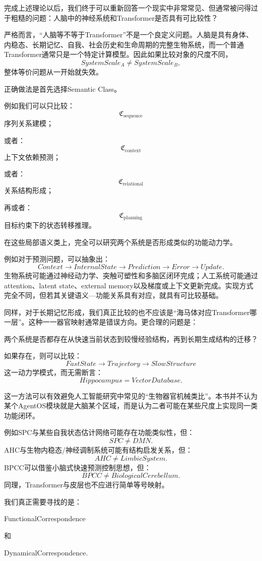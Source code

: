 完成上述理论以后，我们终于可以重新回答一个现实中非常常见、但通常被问得过于粗糙的问题：人脑中的神经系统和Transformer是否具有可比较性？

严格而言，``人脑等不等于Transformer''不是一个良定义问题。人脑是具有身体、内稳态、长期记忆、自我、社会历史和生命周期的完整生物系统，而一个普通Transformer通常只是一个特定计算模型。因此如果比较对象的尺度不同，
\[
SystemScale_A
\neq
SystemScale_B,
\]
整体等价问题从一开始就失效。

正确做法是首先选择Semantic Class。

例如我们可以只比较：
\[
\mathfrak C_{\mathrm{sequence}}
\]
序列关系建模；

或者：
\[
\mathfrak C_{\mathrm{context}}
\]
上下文依赖预测；

或者：
\[
\mathfrak C_{\mathrm{relational}}
\]
关系结构形成；

再或者：
\[
\mathfrak C_{\mathrm{planning}}
\]
目标约束下的状态转移推理。

在这些局部语义类上，完全可以研究两个系统是否形成类似的功能动力学。

例如对于预测问题，可以抽象出：
\[
Context
\rightarrow
InternalState
\rightarrow
Prediction
\rightarrow
Error
\rightarrow
Update.
\]
生物系统可能通过神经动力学、突触可塑性和多脑区闭环完成；人工系统可能通过attention、latent state、external memory以及梯度或上下文更新完成。实现方式完全不同，但若其关键语义—功能关系具有对应，就具有可比较基础。

同样，对于长期记忆形成，我们真正比较的也不应该是``海马体对应Transformer哪一层''。这种一一器官映射通常是错误方向。更合理的问题是：
\begin{statementbox}
两个系统是否都存在从快速当前状态到较慢经验结构，再到长期生成结构的迁移？
\end{statementbox}
如果存在，则可以比较：
\[
FastState
\rightarrow
Trajectory
\rightarrow
SlowStructure
\]
这一动力学模式，而无需断言：
\[
Hippocampus
=
VectorDatabase.
\]

这一方法可以有效避免人工智能研究中常见的``生物器官机械类比''。本书并不认为某个AgentOS模块就是大脑某个区域，而是认为二者可能在某些尺度上实现同一类功能闭环。

例如SPC与某些自我状态估计网络可能存在功能类似性，但：
\[
SPC\neq DMN.
\]
AHC与生物内稳态/神经调制系统可能有结构启发关系，但：
\[
AHC\neq LimbicSystem.
\]
BPCC可以借鉴小脑式快速预测控制思想，但：
\[
BPCC\neq BiologicalCerebellum.
\]
同理，Transformer与皮层也不应进行简单等号映射。

我们真正需要寻找的是：
\begin{statementbox}
FunctionalCorrespondence
\end{statementbox}
和
\begin{statementbox}
DynamicalCorrespondence.
\end{statementbox}

